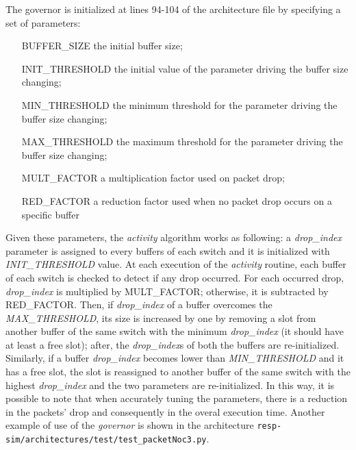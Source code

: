\documentclass[a4paper,11pt,oneside]{article}
\begin{document}
The governor is initialized at lines 94-104 of the architecture file by specifying a set of parameters:
\begin{enumerate}
\item[BUFFER\_SIZE] the initial buffer size;
\item[INIT\_THRESHOLD] the initial value of the parameter driving the buffer size changing;
\item[MIN\_THRESHOLD] the minimum threshold for the parameter driving the buffer size changing;
\item[MAX\_THRESHOLD] the maximum threshold for the parameter driving the buffer size changing;
\item[MULT\_FACTOR] a multiplication factor used on packet drop;
\item[RED\_FACTOR] a reduction factor used when no packet drop occurs on a specific buffer
\end{enumerate}
Given these parameters, the \textit{activity} algorithm works as following: a \textit{drop\_index} parameter is assigned to every buffers of each switch and it is initialized with \textit{INIT\_THRESHOLD} value. At each execution of the \textit{activity} routine, each buffer of each switch is checked to detect if any drop occurred. For each occurred drop, \textit{drop\_index} is multiplied by MULT\_FACTOR; otherwise, it is subtracted by RED\_FACTOR. Then, if \textit{drop\_index} of a buffer overcomes the \textit{MAX\_THRESHOLD}, its size is increased by one by removing a slot from another buffer of the same switch with the minimum \textit{drop\_index} (it should have at least a free slot); after, the \textit{drop\_index}s of both the buffers are re-initialized. Similarly, if a buffer \textit{drop\_index} becomes lower than \textit{MIN\_THRESHOLD} and it has a free slot, the slot is reassigned to another buffer of the same switch with the highest \textit{drop\_index} and the two parameters are re-initialized. In this way, it is possible to note that when accurately tuning the parameters, there is a reduction in the packets' drop and consequently in the overal execution time.
Another example of use of the \textit{governor} is shown in the architecture \texttt{resp-sim/architectures/test/test\linebreak \_packetNoc3.py}.
\end{document}
